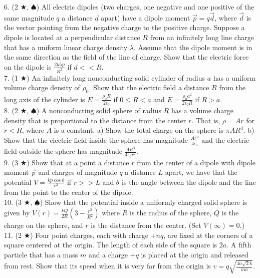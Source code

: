 6. (2 $\bigstar$, $\spadesuit$) All electric dipoles (two charges, one negative and one positive of the same magnitude $q$ a distance $d$ apart) have a dipole moment $\vec p = q \vec d$, where $\vec d$ is the vector pointing from the negative charge to the positive charge. Suppose a dipole is located at a perpendicular distance $R$ from an infinitely long line charge that has a uniform linear charge density $\lambda$. Assume that the dipole moment is in the same direction as the field of the line of charge. Show that the electric force on the dipole is $\frac{2k\lambda p}{R^2}$ if $d << R$.\\
7. (1 $\bigstar$) An infinitely long nonconducting solid cylinder of radius $a$ has a uniform volume charge density of $\rho_0$. Show that the electric field a distance $R$ from the long axis of the cylinder is $E = \frac{\rho_0R}{2\epsilon_0}$ if $0\leq R < a$ and $E = \frac{\rho_0a^2}{2\epsilon_0 R}$ if $R > a$. \\
8. (2 $\bigstar$, $\spadesuit$) A nonconducting solid sphere of radius $R$ has a volume charge density that is proportional to the distance from the center $r$. That is, $\rho = Ar$ for $r < R$, where $A$ is a constant. a) Show the total charge on the sphere is $\pi AR^4$. b) Show that the electric field inside the sphere has magnitude $\frac{Ar^2}{4\epsilon_0}$ and the electric field outside the sphere has magnitude $\frac{AR^4}{4\epsilon_0 r^2}$. \\
9. (3 $\bigstar$) Show that at a point a distance $r$ from the center of a dipole with dipole moment $\vec p$ and charges of magnitude $q$ a distance $L$ apart, we have that the potential $V = \frac{kp\cos \theta}{r^2}$ if $r >> L$ and $\theta$ is the angle between the dipole and the line from the point to the center of the dipole. \\
10. (3 $\bigstar$, $\spadesuit$) Show that the potential inside a uniformly charged solid sphere is given by $V(r) = \frac{kQ}{2R}\left(3 - \frac{r^2}{R^2}\right)$ where $R$ is the radius of the sphere, $Q$ is the charge on the sphere, and $r$ is the distance from the center. (Set $V(\infty) = 0$.)\\
11. (2 $\bigstar$) Four point charges, each with charge $+nq$, are fixed at the corners of a square centered at the origin. The length of each side of the square is $2a$. A fifth particle that has a mass $m$ and a charge $+q$ is placed at the origin and
released from rest. Show that its speed when it is very far from the origin is $v = q\sqrt{\frac{4n\sqrt{2}k}{ma}}$. \\
